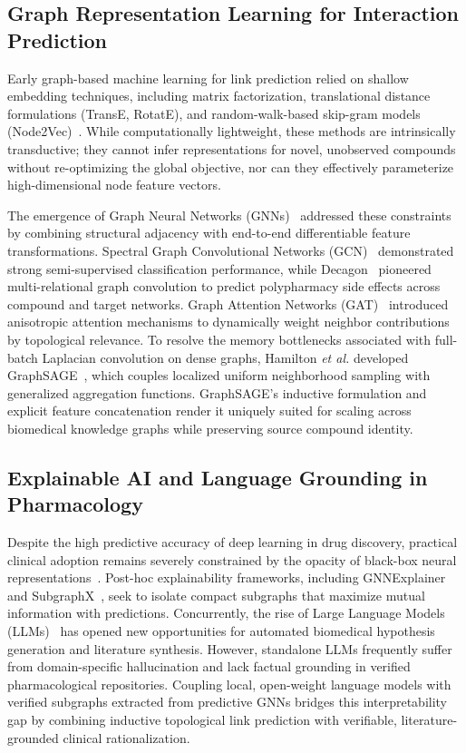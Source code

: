 \documentclass[conference,a4paper]{IEEEtran}
\begin{document}
\subsection{Graph Representation Learning for Interaction Prediction}
Early graph-based machine learning for link prediction relied on shallow embedding techniques, including matrix factorization, translational distance formulations (TransE, RotatE), and random-walk-based skip-gram models (Node2Vec)~\cite{ref18}. While computationally lightweight, these methods are intrinsically transductive; they cannot infer representations for novel, unobserved compounds without re-optimizing the global objective, nor can they effectively parameterize high-dimensional node feature vectors.

The emergence of Graph Neural Networks (GNNs)~\cite{ref4} addressed these constraints by combining structural adjacency with end-to-end differentiable feature transformations. Spectral Graph Convolutional Networks (GCN)~\cite{ref2} demonstrated strong semi-supervised classification performance, while Decagon~\cite{ref24} pioneered multi-relational graph convolution to predict polypharmacy side effects across compound and target networks. Graph Attention Networks (GAT)~\cite{ref_gat} introduced anisotropic attention mechanisms to dynamically weight neighbor contributions by topological relevance. To resolve the memory bottlenecks associated with full-batch Laplacian convolution on dense graphs, Hamilton \textit{et al.} developed GraphSAGE~\cite{ref1}, which couples localized uniform neighborhood sampling with generalized aggregation functions. GraphSAGE's inductive formulation and explicit feature concatenation render it uniquely suited for scaling across biomedical knowledge graphs while preserving source compound identity.

\subsection{Explainable AI and Language Grounding in Pharmacology}
Despite the high predictive accuracy of deep learning in drug discovery, practical clinical adoption remains severely constrained by the opacity of black-box neural representations~\cite{ref4}. Post-hoc explainability frameworks, including GNNExplainer~\cite{ref_gnnexplainer} and SubgraphX~\cite{ref_subgraphx}, seek to isolate compact subgraphs that maximize mutual information with predictions. Concurrently, the rise of Large Language Models (LLMs)~\cite{ref_llama} has opened new opportunities for automated biomedical hypothesis generation and literature synthesis. However, standalone LLMs frequently suffer from domain-specific hallucination and lack factual grounding in verified pharmacological repositories. Coupling local, open-weight language models with verified subgraphs extracted from predictive GNNs bridges this interpretability gap by combining inductive topological link prediction with verifiable, literature-grounded clinical rationalization.
\end{document}
